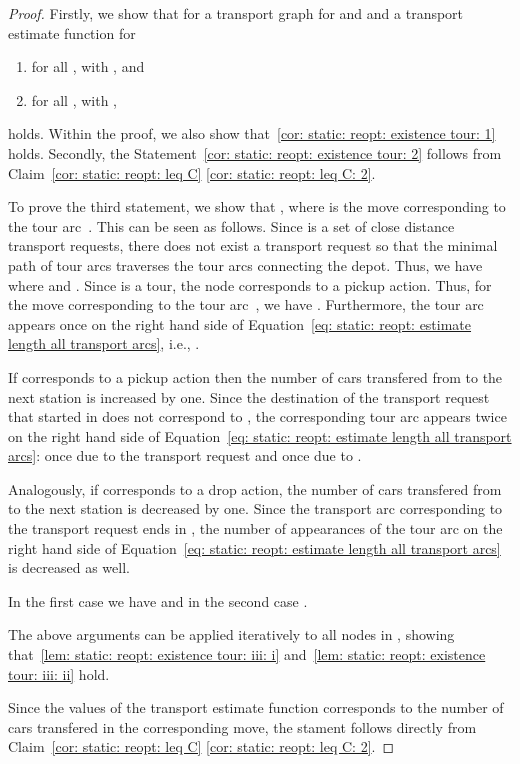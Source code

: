 \documentclass[english]{llncs}
\numberwithin{sublemma}{lemma}
\begin{document}
\begin{proof}
Firstly, we show that for a transport graph  for  and  and a transport estimate function  for  \begin{enumerate}[label=(\alph*),ref=(\alph*)]
      \item \label{lem: static: reopt: existence tour: iii: i}  for all ,  with , and
      \item \label{lem: static: reopt: existence tour: iii: ii}  for all ,  with ,
  \end{enumerate}
holds.
Within the proof, we also show that~\ref{cor: static: reopt: existence tour: 1} holds.
Secondly, the Statement~\ref{cor: static: reopt: existence tour: 2} follows from Claim~\ref{cor: static: reopt: leq C} \ref{cor: static: reopt: leq C: 2}.




To prove the third statement, we show that , where  is the move corresponding to the tour arc~.
This can be seen as follows.
Since  is a set of close distance transport requests, there does not exist a transport request  so that the minimal path of tour arcs traverses the tour arcs connecting the depot.
Thus, we have  where  and .
Since  is a tour, the node  corresponds to a pickup action.
Thus, for the move  corresponding to the tour arc~, we have .
Furthermore, the tour arc  appears once on the right hand side of Equation~\eqref{eq: static: reopt: estimate length all transport arcs}, i.e., .

If  corresponds to a pickup action then the number of cars transfered from  to the next station is increased by one.
Since the destination of the transport request that started in  does not correspond to ,
the corresponding tour arc  appears twice on the right hand side of Equation~\eqref{eq: static: reopt: estimate length all transport arcs}:
once due to the transport request  and once due to .

Analogously, if  corresponds to a drop action, the number of cars transfered from  to the next station is decreased by one.
Since the transport arc corresponding to the transport request  ends in , the number of appearances of the tour arc 
on the right hand side of Equation~\eqref{eq: static: reopt: estimate length all transport arcs} is decreased as well.

In the first case we have  and in the second case .

The above arguments can be applied iteratively to all nodes in , showing that~\ref{lem: static: reopt: existence tour: iii: i} and~\ref{lem: static: reopt: existence tour: iii: ii} hold.


Since the values of the transport estimate function  corresponds to the number of cars transfered in the corresponding move,
the stament follows directly from Claim~\ref{cor: static: reopt: leq C} \ref{cor: static: reopt: leq C: 2}.
\end{proof}
\end{document}
